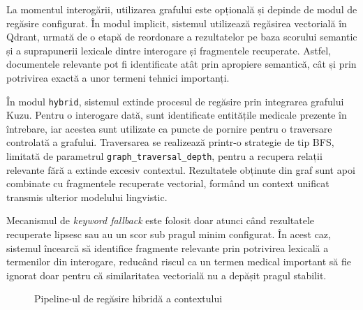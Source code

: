 \documentclass[12pt, a4paper, oneside, romanian]{teza-upb}
\begin{document}
La momentul interogării, utilizarea grafului este opțională și depinde de modul de regăsire configurat. În modul implicit, sistemul utilizează regăsirea vectorială în Qdrant, urmată de o etapă de reordonare a rezultatelor pe baza scorului semantic și a suprapunerii lexicale dintre interogare și fragmentele recuperate. Astfel, documentele relevante pot fi identificate atât prin apropiere semantică, cât și prin potrivirea exactă a unor termeni tehnici importanți.

În modul \texttt{hybrid}, sistemul extinde procesul de regăsire prin integrarea grafului Kuzu. Pentru o interogare dată, sunt identificate entitățile medicale prezente în întrebare, iar acestea sunt utilizate ca puncte de pornire pentru o traversare controlată a grafului. Traversarea se realizează printr-o strategie de tip BFS, limitată de parametrul \texttt{graph\_traversal\_depth}, pentru a recupera relații relevante fără a extinde excesiv contextul. Rezultatele obținute din graf sunt apoi combinate cu fragmentele recuperate vectorial, formând un context unificat transmis ulterior modelului lingvistic.

Mecanismul de \textit{keyword fallback} este folosit doar atunci când rezultatele recuperate lipsesc sau au un scor sub pragul minim configurat. În acest caz, sistemul încearcă să identifice fragmente relevante prin potrivirea lexicală a termenilor din interogare, reducând riscul ca un termen medical important să fie ignorat doar pentru că similaritatea vectorială nu a depășit pragul stabilit.

\begin{figure}[H]
\centering
{}
\caption{Pipeline-ul de regăsire hibridă a contextului}
\label{fig:rag-retrieval}
\end{figure}
\end{document}
